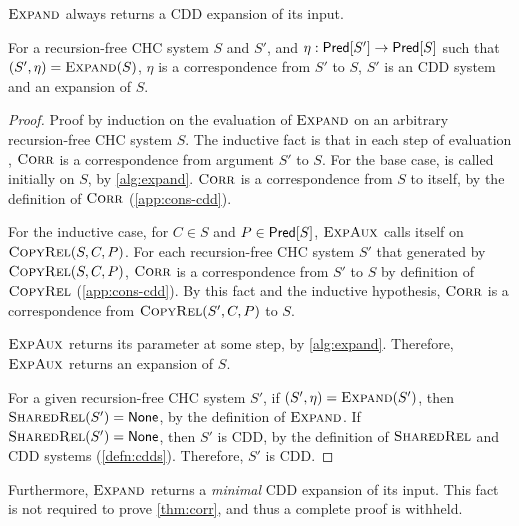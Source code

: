 $\textsc{Expand}$ always returns a CDD expansion of its input.
%
\begin{lem}
  \label{lem:expand-corr}
  For a recursion-free CHC system $S$ and $S'$, and $\eta : \mathsf{Pred}[ S' ] \to \mathsf{Pred}[ S ]$ such that
  $(S', \eta) = \textsc{Expand}(S)$, $\eta$
  is a correspondence from $S'$ to $S$, $S'$ is an CDD system and an expansion
  of $S$.
\end{lem}
%
\begin{proof}
  Proof by induction on the evaluation of $\textsc{Expand}$ on
  an arbitrary recursion-free CHC system $S$.
  The inductive fact is that in each step of evaluation \expandaux,
  $\textsc{Corr}$ is a correspondence from argument
  $S'$ to $S$.
  For the base case, \expandaux is called initially on $S$,
  by \autoref{alg:expand}.
  $\textsc{Corr}$ is a correspondence from $S$ to
  itself, by the definition of $\textsc{Corr}$
  (\autoref{app:cons-cdd}).

  For the inductive case, for $C \in S$ and $P \in \mathsf{Pred}[ S ]$, $\textsc{ExpAux}$ calls itself on 
  $\textsc{CopyRel}(S, C, P)$.
  For each recursion-free CHC system $S'$ that generated by $\textsc{CopyRel}(S, C, P)$,
  $\textsc{Corr}$ is a correspondence from $S'$ to
  $S$ by definition of $\textsc{CopyRel}$
  (\autoref{app:cons-cdd}).
  By this fact and the inductive hypothesis, $\textsc{Corr}$ is
  a correspondence from $\textsc{CopyRel}(S',
  C, P)$ to $S$.

  $\textsc{ExpAux}$ returns its parameter at some step, by
  \autoref{alg:expand}.
  Therefore, $\textsc{ExpAux}$ returns an expansion of $S$.

  For a given recursion-free CHC system $S'$, if $(S', \eta) =
  \textsc{Expand}(S')$, 
  then $\textsc{SharedRel}(S') = \mathsf{None}$, by the definition of $\textsc{Expand}$.
  If $\textsc{SharedRel}(S') = \mathsf{None}$, then $S'$ is
  CDD, by the definition of $\textsc{SharedRel}$ and CDD systems
  (\autoref{defn:cdds}).
  Therefore, $S'$ is CDD.
\end{proof}
%
Furthermore, $\textsc{Expand}$ returns a \emph{minimal} CDD
expansion of its input.
%
This fact is not required to prove \autoref{thm:corr}, and thus a
complete proof is withheld.

